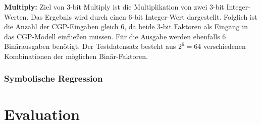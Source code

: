 \textbf{Multiply:} Ziel von 3-bit Multiply ist die Multiplikation von zwei 3-bit Integer-Werten.
Das Ergebnis wird durch einen 6-bit Integer-Wert dargestellt. \cite{cui_weighted_mutation}
Folglich ist die Anzahl der CGP-Eingaben gleich 6, da beide 3-bit Faktoren als Eingang in das CGP-Modell einfließen müssen.
Für die Ausgabe werden ebenfalls 6 Binärausgaben benötigt.
Der Testdatensatz besteht aus $2^6=64$ verschiedenen Kombinationen der möglichen Binär-Faktoren.

\subsubsection{Symbolische Regression}
\label{subsubsec:symbolicRegression}

\section{Evaluation}
\label{sec:Evaluation}

